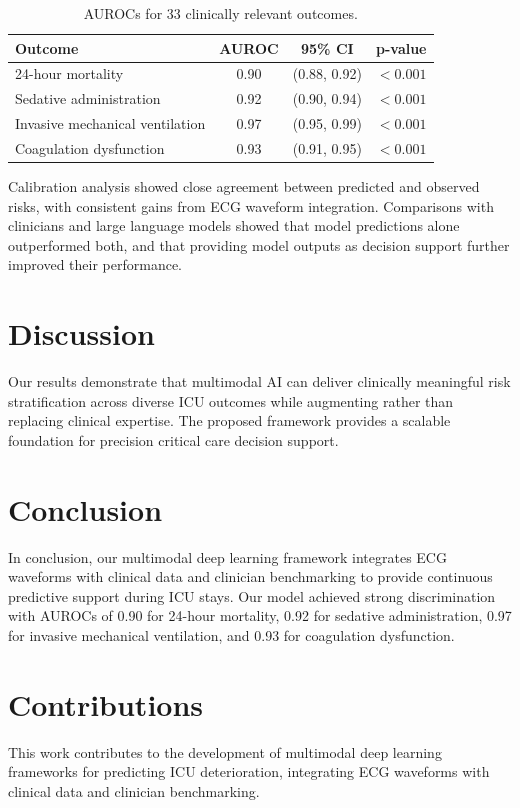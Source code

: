 \documentclass{article}
\begin{document}
        \begin{table}[h!]
        \centering
        \begin{tabular}{lccc}
        \toprule
        \textbf{Outcome} & \textbf{AUROC} & \textbf{95\% CI} & \textbf{p-value} \\
        \midrule
        24-hour mortality & 0.90 & (0.88, 0.92) & $< 0.001$ \\
        Sedative administration & 0.92 & (0.90, 0.94) & $< 0.001$ \\
        Invasive mechanical ventilation & 0.97 & (0.95, 0.99) & $< 0.001$ \\
        Coagulation dysfunction & 0.93 & (0.91, 0.95) & $< 0.001$ \\
        \bottomrule
        \end{tabular}
        \caption{AUROCs for 33 clinically relevant outcomes.}
        \label{tab:auc}
        \end{table}

        Calibration analysis showed close agreement between predicted and observed risks, with consistent gains from ECG waveform integration. Comparisons with clinicians and large language models showed that model predictions alone outperformed both, and that providing model outputs as decision support further improved their performance.

        \section{Discussion}

        Our results demonstrate that multimodal AI can deliver clinically meaningful risk stratification across diverse ICU outcomes while augmenting rather than replacing clinical expertise. The proposed framework provides a scalable foundation for precision critical care decision support.

        \section{Conclusion}

        In conclusion, our multimodal deep learning framework integrates ECG waveforms with clinical data and clinician benchmarking to provide continuous predictive support during ICU stays. Our model achieved strong discrimination with AUROCs of 0.90 for 24-hour mortality, 0.92 for sedative administration, 0.97 for invasive mechanical ventilation, and 0.93 for coagulation dysfunction.

        \section{Contributions}

        This work contributes to the development of multimodal deep learning frameworks for predicting ICU deterioration, integrating ECG waveforms with clinical data and clinician benchmarking.

        
\end{document}
